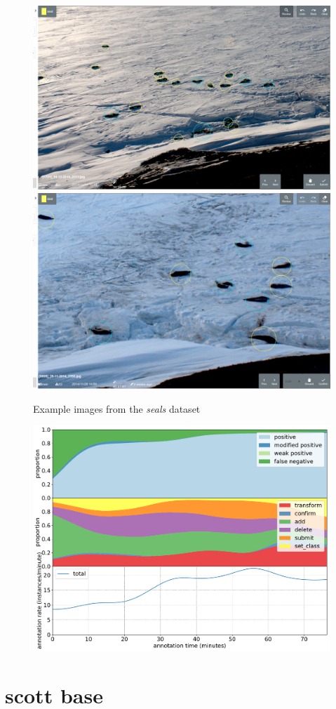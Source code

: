 \begin{figure}[!h]
\centering
  \includegraphics[width=0.475\linewidth]{figures/annotation/screenshots/seals_small2.png}
  \hfill
  \includegraphics[width=0.45\linewidth]{figures/annotation/screenshots/seals_big.png}
  \caption{}
\caption{ Example images from the \emph{seals} dataset}
\label {fig:seals_examples}
\end{figure}

\begin{figure}[!h]
\centering
\includegraphics[width=1.0\linewidth]{charts/action_annotations/seals2.pdf}
\caption{  }
\label{fig:seals2_annotation}
\end{figure}


\pagebreak
\section {scott base}


